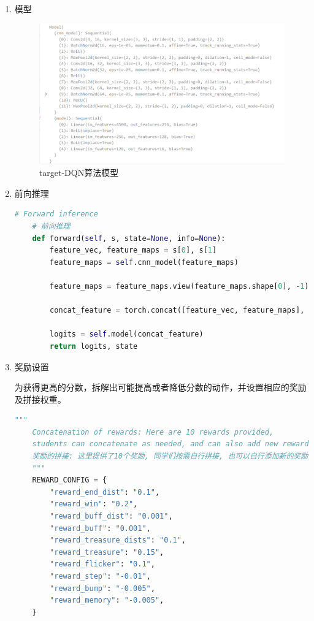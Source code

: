 \begin{enumerate}
\item 模型


\begin{figure}[H]
    \centering
    \includegraphics[width=0.8\linewidth]{pic/target-DQN-model.png}
    \caption{ target-DQN算法模型}
    \label{target-dqn-model}
\end{figure}


\item 前向推理

\begin{lstlisting}[language=Python]
    # Forward inference
    # 前向推理
    def forward(self, s, state=None, info=None):
        feature_vec, feature_maps = s[0], s[1]
        feature_maps = self.cnn_model(feature_maps)

        feature_maps = feature_maps.view(feature_maps.shape[0], -1)

        concat_feature = torch.concat([feature_vec, feature_maps], dim=1)

        logits = self.model(concat_feature)
        return logits, state
\end{lstlisting}

\item 奖励设置

为获得更高的分数，拆解出可能提高或者降低分数的动作，并设置相应的奖励及拼接权重。

\begin{lstlisting}[language=Python]
    """
    Concatenation of rewards: Here are 10 rewards provided,
    students can concatenate as needed, and can also add new rewards themselves
    奖励的拼接: 这里提供了10个奖励, 同学们按需自行拼接, 也可以自行添加新的奖励
    """
    REWARD_CONFIG = {
        "reward_end_dist": "0.1",
        "reward_win": "0.2",
        "reward_buff_dist": "0.001",
        "reward_buff": "0.001",
        "reward_treasure_dists": "0.1",
        "reward_treasure": "0.15",
        "reward_flicker": "0.1",
        "reward_step": "-0.01",
        "reward_bump": "-0.005",
        "reward_memory": "-0.005",
    }


\end{lstlisting}
\end{enumerate}
